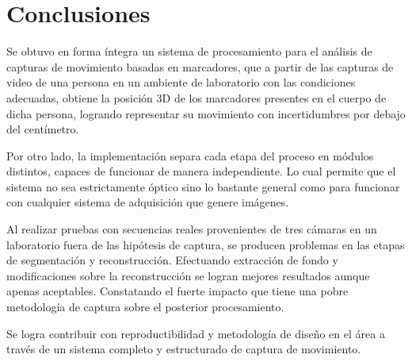 \section{Conclusiones}

Se obtuvo en forma íntegra un sistema de procesamiento para el análisis de capturas de movimiento basadas en marcadores, que a partir de las capturas de video de una persona en un ambiente de laboratorio con las condiciones adecuadas, obtiene la posición 3D de  los marcadores presentes en el cuerpo de dicha persona, logrando representar su movimiento con incertidumbres por debajo del centímetro.
%

Por otro lado, la implementación separa cada etapa del proceso en módulos distintos, capaces de funcionar de manera independiente. Lo cual permite que el sistema no sea estrictamente óptico sino lo bastante general como para funcionar con cualquier sistema de adquisición que genere imágenes. %

Al realizar pruebas con secuencias reales  provenientes de tres cámaras en un laboratorio fuera de las hipótesis de captura, se producen problemas en las etapas de segmentación y reconstrucción. Efectuando extracción de fondo y modificaciones sobre la reconstrucción se logran mejores resultados aunque apenas aceptables. Constatando el fuerte impacto que tiene una pobre metodología de captura sobre el posterior procesamiento.

Se logra contribuir con reproductibilidad y metodología de diseño en el área a través de un sistema completo y estructurado de captura de movimiento.
